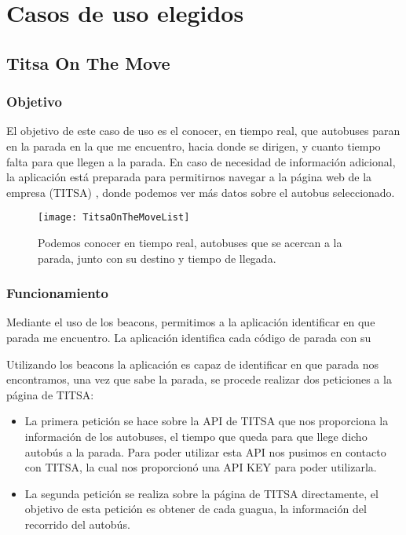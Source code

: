\section{Casos de uso elegidos}


\subsection{Titsa On The Move}


\subsubsection{Objetivo}


El objetivo de este caso de uso es el conocer, en tiempo real, que autobuses paran en la parada en la que me encuentro, hacia donde se dirigen, y cuanto tiempo falta para que llegen a la parada. En caso de necesidad de información adicional, la aplicación está preparada para permitirnos navegar a la página web de la empresa (TITSA) , donde podemos ver más datos sobre el autobus seleccionado.

\begin{figure}[H]
	\centering
	\texttt{[image: TitsaOnTheMoveList]}
	\caption{Podemos conocer en tiempo real, autobuses que se acercan a la parada, junto con su destino y tiempo de llegada.}
	\label{fig:titsaOnTheMoveList}
\end{figure}


\subsubsection{Funcionamiento}


Mediante el uso de los beacons, permitimos a la aplicación identificar en que parada me encuentro. La aplicación identifica cada código de parada con su 

Utilizando los beacons la aplicación es capaz de identificar en que parada nos encontramos, una vez que sabe la parada, se procede realizar dos peticiones a la página de TITSA: 

\begin{itemize}
\item La primera petición se hace sobre la API de TITSA que nos proporciona la información de los autobuses, el tiempo que queda para que llege dicho autobús a la parada. Para poder utilizar esta API nos pusimos en contacto con TITSA, la cual nos proporcionó una API KEY para poder utilizarla.
\item La segunda petición se realiza sobre la página de TITSA directamente, el objetivo de esta petición es obtener de cada guagua, la información del recorrido del autobús.
\end{itemize}

